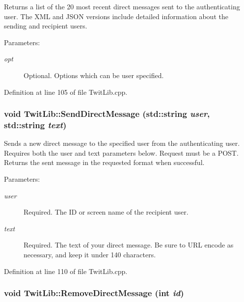 Returns a list of the 20 most recent direct messages sent to the authenticating user. The XML and JSON versions include detailed information about the sending and recipient users. \begin{Desc}
\item[Parameters:]
\begin{description}
\item[{\em opt}]Optional. Options which can be user specified. \end{description}
\end{Desc}


Definition at line 105 of file TwitLib.cpp.\hypertarget{classTwitLib_3a02fb42122cdbb9ebc1c16aed7c2c66}{
\subsubsection{\setlength{\rightskip}{0pt plus 5cm}void TwitLib::SendDirectMessage (std::string {\em user}, \/  std::string {\em text})}}
\label{classTwitLib_3a02fb42122cdbb9ebc1c16aed7c2c66}


Sends a new direct message to the specified user from the authenticating user. Requires both the user and text parameters below. Request must be a POST. Returns the sent message in the requested format when successful. \begin{Desc}
\item[Parameters:]
\begin{description}
\item[{\em user}]Required. The ID or screen name of the recipient user. \item[{\em text}]Required. The text of your direct message. Be sure to URL encode as necessary, and keep it under 140 characters. \end{description}
\end{Desc}


Definition at line 110 of file TwitLib.cpp.\hypertarget{classTwitLib_8e443d79afbb1dc30cb0616c8bfb9ab8}{
\subsubsection{\setlength{\rightskip}{0pt plus 5cm}void TwitLib::RemoveDirectMessage (int {\em id})}}
\label{classTwitLib_8e443d79afbb1dc30cb0616c8bfb9ab8}



